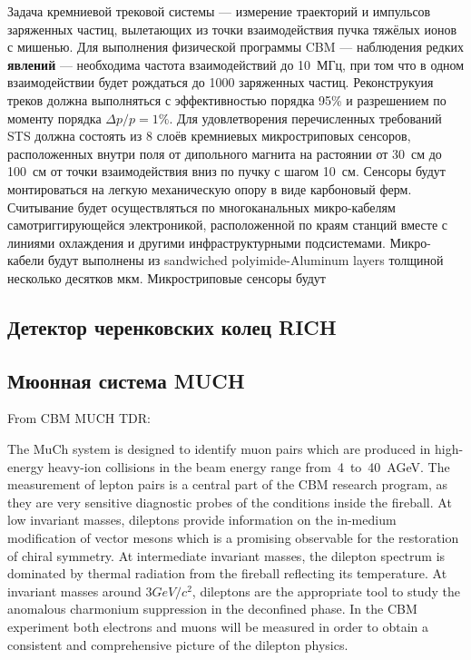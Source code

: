 Задача кремниевой трековой системы --- измерение траекторий и импульсов заряженных частиц, вылетающих из точки взаимодействия пучка тяжёлых ионов с мишенью. Для выполнения физической программы CBM --- наблюдения редких \textbf{явлений} --- необходима частота взаимодействий до 10~МГц, при том что в одном взаимодействии будет рождаться до 1000 заряженных частиц. Реконструкуия треков должна выполняться с эффективностью порядка 95\% и разрешением по моменту порядка $\Delta p / p = 1\%$. Для удовлетворения перечисленных требований STS должна состоять из 8 слоёв кремниевых микростриповых сенсоров, расположенных внутри поля от дипольного магнита на растоянии от 30~см до 100~см от точки взаимодействия вниз по пучку с шагом 10~см.
Сенсоры будут монтироваться на легкую механическую опору в виде карбоновый ферм. Считывание будет осуществляться по многоканальных микро-кабелям самотриггирующейся электроникой, расположенной по краям станций вместе с линиями охлаждения и другими инфраструктурными подсистемами. Микро-кабели будут выполнены из sandwiched polyimide-Aluminum layers толщиной несколько десятков мкм. Микростриповые сенсоры будут 

\subsection{Детектор черенковских колец RICH}\label{sec:secRICH}

\subsection{Мюонная система MUCH}\label{sec:secMUCH}

From CBM MUCH TDR:

The MuCh system is designed to identify muon pairs which are produced in high-energy heavy-ion collisions in the beam energy range from~4~to~40~AGeV. The measurement of lepton pairs is a central part of the CBM research program, as they are very sensitive diagnostic probes of the conditions inside the fireball. At low invariant masses, dileptons provide information on the in-medium modification of vector mesons which is a promising observable for the restoration of chiral symmetry. At intermediate invariant masses, the dilepton spectrum is dominated by thermal radiation from the fireball reflecting its temperature. At invariant masses around $ 3 GeV/c^{2} $, dileptons are the appropriate tool to study the anomalous charmonium suppression in the deconfined phase. In the CBM experiment both electrons and muons will be measured in order to obtain a consistent and comprehensive picture of the dilepton physics.

